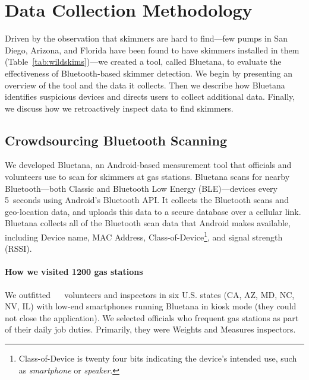 

\section{Data Collection Methodology}
\label{sec:bluetana}

Driven by the observation that skimmers are hard to find---few pumps in San Diego, Arizona, and Florida have been found to have 
skimmers installed in them (Table~\ref{tab:wildskims})---we created a tool, called Bluetana, to evaluate the
effectiveness of Bluetooth-based skimmer detection.
%
We begin by presenting an overview of the tool and the data it collects.
%
Then we describe how Bluetana identifies suspicious devices and directs users
to collect additional data.
%
Finally, we discuss how we retroactively inspect data to find skimmers. 

\subsection{Crowdsourcing Bluetooth Scanning}
\label{sec:bluetana:tool}

We developed Bluetana, an Android-based measurement tool that officials and volunteers
use to scan for skimmers at gas stations.
%
%
Bluetana scans for nearby Bluetooth---both Classic and Bluetooth Low
Energy (BLE)---devices every 5~seconds using Android's Bluetooth API.
%
It collects the Bluetooth scans and geo-location data, and uploads this data to a
secure database over a cellular link.
%
Bluetana collects all of the Bluetooth scan data that Android makes available, including
Device name, MAC Address, Class-of-Device\footnote{Class-of-Device is twenty
  four bits indicating the device's intended use, such as \emph{smartphone} or
  \emph{speaker}.}, and signal strength (RSSI).

\paragraph{How we visited 1200 gas stations}
%
We outfitted ~\numvolunteers~ volunteers and inspectors in six U.S. states (CA, AZ, MD, NC,
NV, IL) with low-end smartphones running Bluetana in kiosk mode (they could not
close the application).
%
We selected officials who frequent gas stations as part of their daily job
duties. Primarily, they were Weights and Measures inspectors.
%

